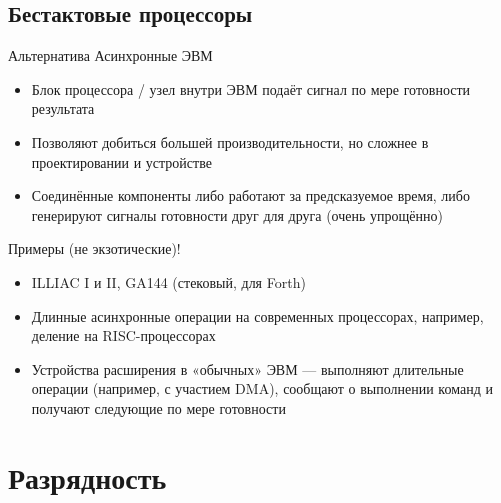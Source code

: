 \documentclass[xetex,aspectratio=43]{beamer}
\begin{document}
\subsection{Бестактовые процессоры}

\begin{frame}{Альтернатива}
    Асинхронные ЭВМ

    \begin{itemize}
        \tightlist
        \item
        Блок процессора / узел внутри ЭВМ подаёт сигнал по мере готовности
        результата
        \item
        Позволяют добиться большей производительности, но сложнее в
        проектировании и устройстве
        \item
        Соединённые компоненты либо работают за предсказуемое время, либо генерируют сигналы готовности друг для друга (очень упрощённо)
    \end{itemize}

    Примеры (не экзотические)!

    \begin{itemize}
        \tightlist
        \item
        ILLIAC I и II, GA144 (стековый, для Forth)
        \item
        Длинные асинхронные операции на современных процессорах, например,
        деление на RISC-процессорах
    \end{itemize}

    \pause

    \begin{itemize}
        \item
        Устройства расширения в «обычных» ЭВМ --- выполняют длительные
        операции (например, с участием DMA), сообщают о выполнении команд и
        получают следующие по мере готовности
    \end{itemize}
\end{frame}

\section{Разрядность}
\end{document}
